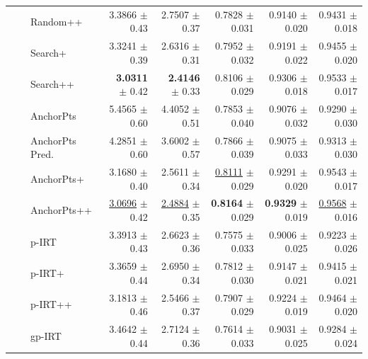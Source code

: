 \begin{longtable}{llp{}rrrrr}
 &  & Random++ & 3.3866 {\scriptsize $\pm$ 0.43} & 2.7507 {\scriptsize $\pm$ 0.37} & 0.7828 {\scriptsize $\pm$ 0.031} & 0.9140 {\scriptsize $\pm$ 0.020} & 0.9431 {\scriptsize $\pm$ 0.018} \\
 &  & Search+ & 3.3241 {\scriptsize $\pm$ 0.39} & 2.6316 {\scriptsize $\pm$ 0.31} & 0.7952 {\scriptsize $\pm$ 0.032} & 0.9191 {\scriptsize $\pm$ 0.022} & 0.9455 {\scriptsize $\pm$ 0.020} \\
 &  & Search++ & \textbf{3.0311} {\scriptsize $\pm$ 0.42} & \textbf{2.4146} {\scriptsize $\pm$ 0.33} & 0.8106 {\scriptsize $\pm$ 0.029} & 0.9306 {\scriptsize $\pm$ 0.018} & 0.9533 {\scriptsize $\pm$ 0.017} \\
 &  & AnchorPts & 5.4565 {\scriptsize $\pm$ 0.60} & 4.4052 {\scriptsize $\pm$ 0.51} & 0.7853 {\scriptsize $\pm$ 0.040} & 0.9076 {\scriptsize $\pm$ 0.032} & 0.9290 {\scriptsize $\pm$ 0.030} \\
 &  & AnchorPts Pred. & 4.2851 {\scriptsize $\pm$ 0.60} & 3.6002 {\scriptsize $\pm$ 0.57} & 0.7866 {\scriptsize $\pm$ 0.039} & 0.9075 {\scriptsize $\pm$ 0.033} & 0.9313 {\scriptsize $\pm$ 0.030} \\
 &  & AnchorPts+ & 3.1680 {\scriptsize $\pm$ 0.40} & 2.5611 {\scriptsize $\pm$ 0.34} & \underline{0.8111} {\scriptsize $\pm$ 0.029} & 0.9291 {\scriptsize $\pm$ 0.020} & 0.9543 {\scriptsize $\pm$ 0.017} \\
 &  & AnchorPts++ & \underline{3.0696} {\scriptsize $\pm$ 0.42} & \underline{2.4884} {\scriptsize $\pm$ 0.35} & \textbf{0.8164} {\scriptsize $\pm$ 0.029} & \textbf{0.9329} {\scriptsize $\pm$ 0.019} & \underline{0.9568} {\scriptsize $\pm$ 0.016} \\
 &  & p-IRT & 3.3913 {\scriptsize $\pm$ 0.43} & 2.6623 {\scriptsize $\pm$ 0.36} & 0.7575 {\scriptsize $\pm$ 0.033} & 0.9006 {\scriptsize $\pm$ 0.025} & 0.9223 {\scriptsize $\pm$ 0.026} \\
 &  & p-IRT+ & 3.3659 {\scriptsize $\pm$ 0.44} & 2.6950 {\scriptsize $\pm$ 0.34} & 0.7812 {\scriptsize $\pm$ 0.030} & 0.9147 {\scriptsize $\pm$ 0.021} & 0.9415 {\scriptsize $\pm$ 0.021} \\
 &  & p-IRT++ & 3.1813 {\scriptsize $\pm$ 0.46} & 2.5466 {\scriptsize $\pm$ 0.37} & 0.7907 {\scriptsize $\pm$ 0.029} & 0.9224 {\scriptsize $\pm$ 0.019} & 0.9464 {\scriptsize $\pm$ 0.020} \\
 &  & gp-IRT & 3.4642 {\scriptsize $\pm$ 0.44} & 2.7124 {\scriptsize $\pm$ 0.36} & 0.7614 {\scriptsize $\pm$ 0.033} & 0.9031 {\scriptsize $\pm$ 0.025} & 0.9284 {\scriptsize $\pm$ 0.024} \\

\end{longtable}
